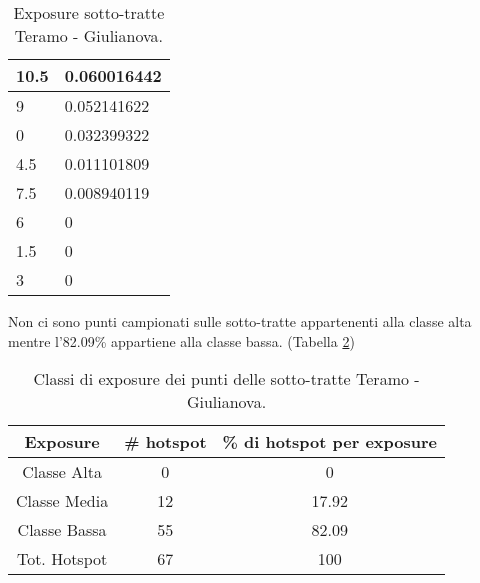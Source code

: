 \begin{table}[H]
\begin{tabular}{|l|l|}
		\rowcolor[HTML]{32CB00} 
		10.5                                                      & 0.060016442                                                    \\ \hline
		\rowcolor[HTML]{32CB00} 
		9                                                         & 0.052141622                                                    \\ \hline
		\rowcolor[HTML]{32CB00} 
		0                                                         & 0.032399322                                                    \\ \hline
		\rowcolor[HTML]{32CB00} 
		4.5                                                       & 0.011101809                                                    \\ \hline
		\rowcolor[HTML]{32CB00} 
		7.5                                                       & 0.008940119                                                    \\ \hline
		\rowcolor[HTML]{32CB00} 
		6                                                         & 0                                                              \\ \hline
		\rowcolor[HTML]{32CB00} 
		1.5                                                       & 0                                                              \\ \hline
		\rowcolor[HTML]{32CB00} 
		3                                                         & 0                                                              \\ \hline
	\end{tabular}
	\caption{Exposure sotto-tratte Teramo - Giulianova.}
	\label{exposure_teramo_giulianova}
\end{table}

Non ci sono punti campionati sulle sotto-tratte appartenenti alla classe alta mentre l'82.09\% appartiene alla classe bassa. (Tabella \ref{risultati_teramo_giulianova})

\begin{table}[H]
	\centering
	\begin{tabular}{|c|c|c|}
		\hline
		\rowcolor[HTML]{C0C0C0} 
		\textbf{Exposure} & \textbf{\# hotspot} & \textbf{\% di hotspot per exposure} \\ \hline
		Classe Alta       & 0                  & 0                                   \\ \hline
		Classe Media      & 12                 & 17.92                           \\ \hline
		Classe Bassa      & 55              & 82.09                               \\ \hline
		Tot. Hotspot      & 67               & 100                                 \\ \hline
	\end{tabular}
	\caption{Classi di exposure dei punti delle sotto-tratte Teramo - Giulianova.}
	\label{risultati_teramo_giulianova}
\end{table}

